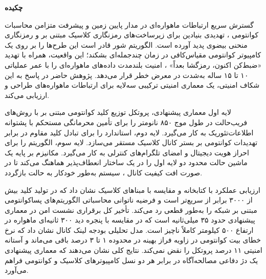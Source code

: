 \documentclass[a4paper,14pt]{extreport}
\begin{document}
\begin{center}
{\Large\bfseries چکیده}
\end{center}

\vspace{0.5cm}

{\normalsize
گسترش سریع ارتباطات ماهواره‌ای در مدار پایین زمین  و پیشرفت متزامن محاسبات کوانتومی ، تهدیدی بنیادین برای زیرساخت‌های رمزنگاری کلاسیک مبتنی بر  و رمزنگاری منحنی بیضوی  پدید آورده است. الگوریتم شور  قادر است این طرح‌ها را بر روی یک کامپیوتر کوانتومی مقیاس‌کافی در زمان چندجمله‌ای بشکند؛ این واقعیت، همراه با تهدید «ضبط‌کن اکنون، رمزگشا بعداً» ، امنیت بلندمدت داده‌های ماهواره‌ای را با عمر عملیاتی ۱۰ تا ۱۵ ساله به‌شدت در معرض خطر قرار می‌دهد. پژوهش حاضر در پاسخ به این شکاف امنیتی، یک معماری امنیتی ترکیبی سه‌لایه برای ارتباطات ماهواره‌های  طراحی و ارزیابی می‌کند.

لایه اول معماری پیشنهادی، پروتکل توزیع کلید کوانتومی  مبتنی بر  با روش‌های فریب‌حالت  در طول موج ۸۵۰ نانومتر را برای تأمین محرمانگی مستحکم با پشتوانه اطلاعات‌تئوریک  به کار می‌گیرد. لایه دوم، استاندارد  را برای تبادل کلید مقاوم در برابر تهدیدات کوانتومی بر بستر کانال کلاسیک مستقر می‌سازد. لایه سوم، الگوریتم  را برای احراز هویت دیجیتال و امضای تلگرام‌های کنترلی به کار می‌گیرد. مکانیزم  بر پایه یک ماشین حالت محدود  دو لایه اول را در یک ساختار انعطاف‌پذیر هماهنگ می‌کند تا در صورت افت کیفیت کانال ، سیستم به‌طور خودکار به حالت  بازگردد.

ارزیابی عملکرد با کتابخانه  و مقایسه با مبناهای کلاسیک نشان داد که  در تولید کلید بیش از ۳۰۰۰ برابر از  سریع‌تر است و فرضیه ناتوانی محاسباتی الگوریتم‌های پساکوانتومی مبتنی بر شبکه را به‌طور قطعی رد می‌کند. تأخیر کل برقراری نشست امن در معماری پیشنهادی حدود ۳۵ میلی‌ثانیه است که در مقایسه با پنجره دید ۳۰۰ ثانیه‌ای ماهواره  در ارتفاع ۵۰۰ کیلومتر کاملاً ناچیز است. مدل تحلیلی بودجه لینک  کانال  نشان داد که نرخ خطای بیت کوانتومی  در زاویه فراز بهینه در محدوده ۱ تا ۳ درصد باقی می‌ماند و آستانه امنیتی ۱۱ درصد پروتکل  را نقض نمی‌کند. نتایج کلی نشان می‌دهند که معماری پیشنهادی یک دژ دفاعی مصالحه‌آگاه در برابر هر دو نسل کامپیوترهای کلاسیک و کوانتومی فراهم می‌آورد.
}
\end{document}
